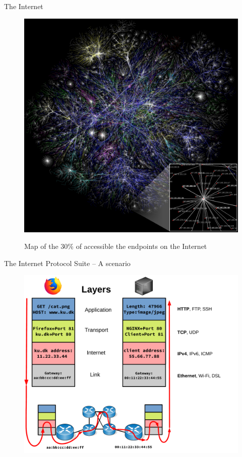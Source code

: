 \begin{frame}
The Internet

\begin{figure}
	\centering
\includegraphics[scale=0.15]{./background/internet_map.jpg}
\label{fig: Internet map}
\caption{Map of the 30\% of accessible the endpoints on the Internet}
\end{figure}

\end{frame}


\begin{frame}
The Internet Protocol Suite -- A scenario
\begin{figure}
	\centering
\includegraphics[scale=0.28]{./background/internet_scenario.pdf}
\end{figure}



\end{frame}


